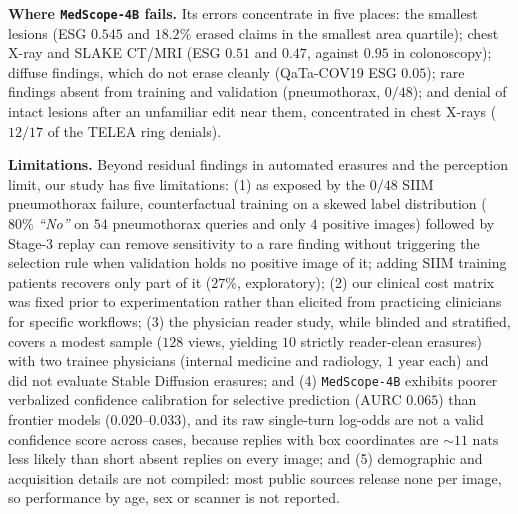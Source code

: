 \documentclass[journal]{IEEEtran}
\begin{document}
\textbf{Where \texttt{MedScope-4B} fails.} Its errors concentrate in five places: the smallest lesions (ESG $0.545$ and $18.2\%$ erased claims in the smallest area quartile); chest X-ray and SLAKE CT/MRI (ESG $0.51$ and $0.47$, against $0.95$ in colonoscopy); diffuse findings, which do not erase cleanly (QaTa-COV19 ESG $0.05$); rare findings absent from training and validation (pneumothorax, $0/48$); and denial of intact lesions after an unfamiliar edit near them, concentrated in chest X-rays ($12/17$ of the TELEA ring denials).

\textbf{Limitations.} Beyond residual findings in automated erasures and the perception limit, our study has five limitations: (1) as exposed by the $0/48$ SIIM pneumothorax failure, counterfactual training on a skewed label distribution ($80\%$ \emph{``No''} on $54$ pneumothorax queries and only $4$ positive images) followed by Stage-3 replay can remove sensitivity to a rare finding without triggering the selection rule when validation holds no positive image of it; adding SIIM training patients recovers only part of it ($27\%$, exploratory); (2) our clinical cost matrix was fixed prior to experimentation rather than elicited from practicing clinicians for specific workflows; (3) the physician reader study, while blinded and stratified, covers a modest sample ($128$ views, yielding $10$ strictly reader-clean erasures) with two trainee physicians (internal medicine and radiology, $1\text{ year}$ each) and did not evaluate Stable Diffusion erasures; and (4) \texttt{MedScope-4B} exhibits poorer verbalized confidence calibration for selective prediction ($\text{AURC } 0.065$) than frontier models ($0.020\text{--}0.033$), and its raw single-turn log-odds are not a valid confidence score across cases, because replies with box coordinates are $\sim 11\text{ nats}$ less likely than short absent replies on every image; and (5) demographic and acquisition details are not compiled: most public sources release none per image, so performance by age, sex or scanner is not reported.
\end{document}
